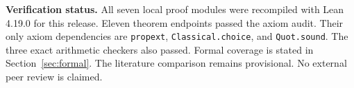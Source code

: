 \noindent\textbf{Verification status.} All seven local proof modules were recompiled with Lean 4.19.0 for this release. Eleven theorem endpoints passed the axiom audit. Their only axiom dependencies are \texttt{propext}, \texttt{Classical.choice}, and \texttt{Quot.sound}. The three exact arithmetic checkers also passed. Formal coverage is stated in Section~\ref{sec:formal}. The literature comparison remains provisional. No external peer review is claimed.
